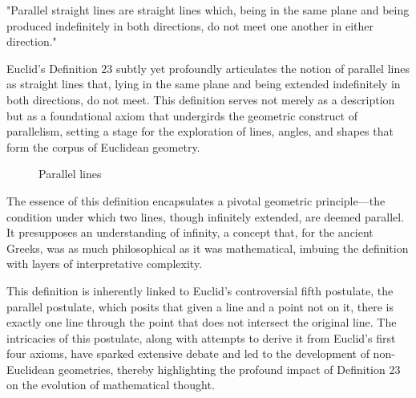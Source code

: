 
\begin{defin}
"Parallel straight lines are straight lines which, being in the same plane and being produced indefinitely in both directions, do not meet one another in either direction."
\end{defin}

Euclid's Definition 23 subtly yet profoundly articulates the notion of parallel lines as straight lines that, lying in the same plane and being extended indefinitely in both directions, do not meet. This definition serves not merely as a description but as a foundational axiom that undergirds the geometric construct of parallelism, setting a stage for the exploration of lines, angles, and shapes that form the corpus of Euclidean geometry.

\begin{figure}[h]
    \centering
    \caption{Parallel lines}
\end{figure}

The essence of this definition encapsulates a pivotal geometric principle—the condition under which two lines, though infinitely extended, are deemed parallel. It presupposes an understanding of infinity, a concept that, for the ancient Greeks, was as much philosophical as it was mathematical, imbuing the definition with layers of interpretative complexity.

This definition is inherently linked to Euclid's controversial fifth postulate, the parallel postulate, which posits that given a line and a point not on it, there is exactly one line through the point that does not intersect the original line. The intricacies of this postulate, along with attempts to derive it from Euclid's first four axioms, have sparked extensive debate and led to the development of non-Euclidean geometries, thereby highlighting the profound impact of Definition 23 on the evolution of mathematical thought.

